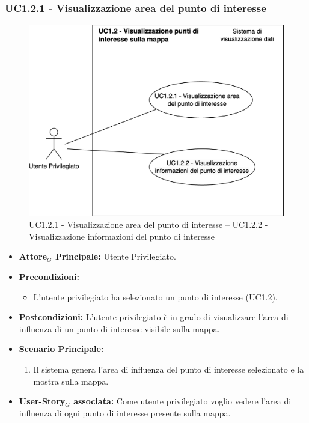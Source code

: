\documentclass[11pt]{article}
\begin{document}
\begin{justify}
\subsubsection{\textbf{UC1.2.1 - Visualizzazione area del punto di interesse}}
\begin{figure}[H]
    \centering
    \includegraphics[width=0.7\linewidth]{UC1.2.12image.png}
    \caption{UC1.2.1 - Visualizzazione area del punto di interesse -- UC1.2.2 - Visualizzazione informazioni del punto di interesse}
    \label{fig:UC1.2.1-UC1.2.2}
\end{figure}
\begin{itemize}
     \item \textbf{Attore$_G$ Principale:} Utente Privilegiato.
     \item \textbf{Precondizioni:}
        \begin{itemize}
            \item L'utente privilegiato ha selezionato un punto di interesse (UC1.2).
        \end{itemize}
     \item \textbf{Postcondizioni:} L'utente privilegiato è in grado di visualizzare l'area di influenza di un punto di interesse visibile sulla mappa.
     \item \textbf{Scenario Principale:}
        \begin{enumerate}
            \item Il sistema genera l'area di influenza del punto di interesse selezionato e la mostra sulla mappa.
        \end{enumerate}
     \item \textbf{User-Story$_G$ associata:}
     Come utente privilegiato voglio vedere l'area di influenza di ogni punto di interesse presente sulla mappa.
\end{itemize}


\end{justify}
\end{document}
